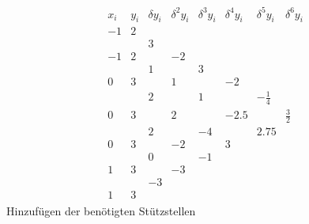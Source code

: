 \documentclass[10pt,a4paper]{article}
\begin{document}
	\begin{align*}
		\begin{array}{cc|rrrrrr}
			x_i & y_i & \delta y_i & \delta^2 y_i & \delta^3y_i & \delta^4y_i &  \delta^5y_i & \delta^6y_i \\ \hline
			-1  &  2  &            &  \\
			    &     &          3 &  \\
			-1  &  2  &            &           -2 &  \\
			    &     &          1 &              &           3 &  \\
			 0  &  3  &            &            1 &             &          -2 &  \\
			    &     &          2 &              &           1 &             & -\frac{1}{4} &  \\
			 0  &  3  &            &            2 &             &        -2.5 &              & \frac{3}{2} \\
			    &     &          2 &              &          -4 &             &         2.75 &  \\
			 0  &  3  &            &           -2 &             &           3 &  \\
			    &     &          0 &              &          -1 &  \\
			 1  &  3  &            &           -3 &  \\
			    &     &         -3 &  \\
			 1  &  3  &            &
		\end{array}
	\end{align*}
	Hinzufügen der benötigten Stützstellen
\end{document}
